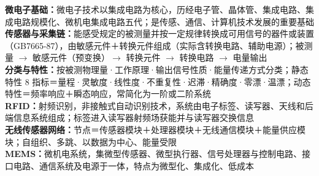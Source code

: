 \documentclass[a4paper,11pt]{article}
\begin{document}

\begin{knowmap}
\textbf{微电子基础：}微电子技术以集成电路为核心，历经电子管、晶体管、集成电路、集成电路规模化、微机电集成电路五代；是传感、通信、计算机技术发展的重要基础\\[2pt]
\textbf{传感器与采集链：}能感受规定的被测量并按一定规律转换成可用信号的器件或装置（GB7665-87），由敏感元件＋转换元件组成（实际含转换电路、辅助电源）；被测量 $\rightarrow$ 敏感元件（预变换）$\rightarrow$ 转换元件 $\rightarrow$ 转换电路 $\rightarrow$ 电量输出\\[2pt]
\textbf{分类与特性：}按被测物理量·工作原理·输出信号性质·能量传递方式分类；静态特性 8 指标＝量程·灵敏度·线性度·不重复性·迟滞·精确度·零漂·温漂；动态特性＝频率响应＋瞬态响应，常简化为一阶或二阶系统\\[2pt]
\textbf{RFID：}射频识别，非接触式自动识别技术，系统由电子标签、读写器、天线和后端信息系统组成；标签进入读写器射频场获能并与读写器交换信息\\[2pt]
\textbf{无线传感器网络：}节点＝传感器模块＋处理器模块＋无线通信模块＋能量供应模块；自组织、多跳、以数据为中心、能量受限\\[2pt]
\textbf{MEMS：}微机电系统，集微型传感器、微型执行器、信号处理器与控制电路、接口电路、通信系统及电源于一体，特点为微型化、集成化、低成本
\end{knowmap}
\end{document}
